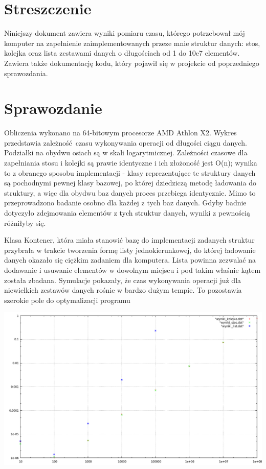 \part{Streszczenie}
Niniejszy dokument zawiera wyniki pomiaru czasu, którego potrzebował mój komputer na zapełnienie zaimplementowanych przeze mnie struktur danych: stos, kolejka oraz lista zestawami danych o długościach od 1 do 10e7 elementów. Zawiera także dokumentację kodu, który pojawił się w projekcie od poprzedniego sprawozdania.

\part{Sprawozdanie}
Obliczenia wykonano na 64-bitowym procesorze AMD Athlon X2. Wykres przedstawia zależność czasu wykonywania operacji od długości ciągu danych. Podziałki na obydwu osiach są w skali logarytmicznej. Zależności czasowe dla zapełniania stosu i kolejki są prawie identyczne i ich złożoność jest O(n); wynika to z obranego sposobu implementacji - klasy reprezentujące te struktury danych są pochodnymi pewnej klasy bazowej, po której dziedziczą metodę ładowania do struktury, a więc dla obydwu baz danych proces przebiega identycznie. Mimo to przeprowadzono badanie osobno dla każdej z tych baz danych. Gdyby badnie dotyczyło zdejmowania elementów z tych struktur danych, wyniki z pewnością różniłyby się. 

Klasa Kontener, która miała stanowić bazę do implementacji zadanych struktur przybrała w trakcie tworzenia formę listy jednokierunkowej, do której ładowanie danych okazało się ciężkim zadaniem dla komputera. Lista powinna zezwalać na dodawanie i usuwanie elementów w dowolnym miejscu i pod takim właśnie kątem została zbadana. Symulacje pokazały, że czas wykonywania operacji już dla niewielkich zestawów danych rośnie w bardzo dużym tempie. To pozostawia szerokie pole do optymalizacji programu
\centerline{\includegraphics[width=\textwidth,height=\textheight,keepaspectratio]{wykres2.png}}
